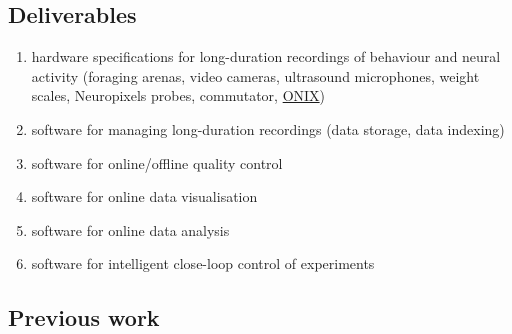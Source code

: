 \subsection{Deliverables}

\begin{enumerate}

    \item hardware specifications for long-duration recordings of behaviour and
        neural activity (foraging arenas, video cameras, ultrasound
        microphones, weight scales, Neuropixels probes, commutator,
        \href{https://www.nature.com/articles/s41592-024-02521-1}{ONIX})

    \item software for managing long-duration recordings (data storage, data
        indexing)

    \item software for online/offline quality control

    \item software for online data visualisation

    \item software for online data analysis

    \item software for intelligent close-loop control of experiments

\end{enumerate}

\subsection{Previous work}

